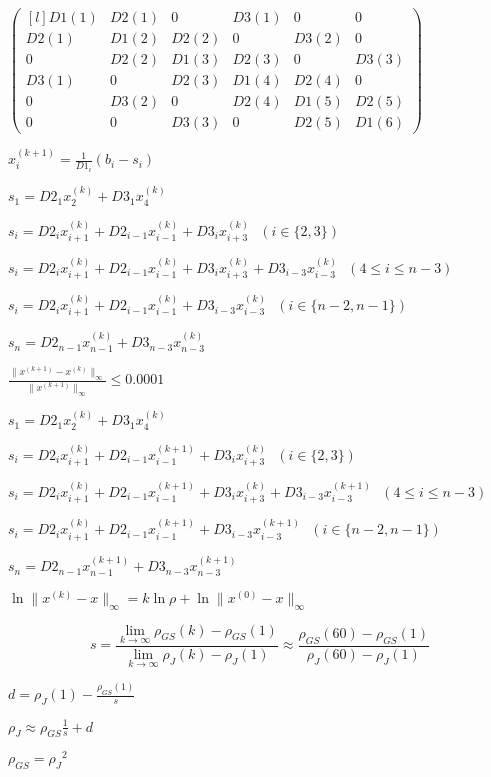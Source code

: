 \documentclass{article}
\begin{document}
	$
	\begin{pmatrix*}[l]
		D1(1) & D2(1) & 0 & D3(1) & 0 & 0 \\
		D2(1) & D1(2) & D2(2) & 0 & D3(2) & 0 \\
		0 & D2(2) & D1(3) & D2(3) & 0 & D3(3)\\
		D3(1) & 0 & D2(3) & D1(4) & D2(4) & 0 \\
		0 & D3(2) & 0 & D2(4) & D1(5) & D2(5) \\
		0 & 0 & D3(3) & 0 & D2(5) & D1(6)
	\end{pmatrix*}
	$
	
	$
	x_i^{(k+1)} = 
	\frac{1}{D1_i}(b_i-s_i)
	$
	
	$ 
	s_1 = D2_1x^{(k)}_2 + D3_1x_4^{(k)}
	$
	
	$
	s_i =  D2_ix^{(k)}_{i+1} + D2_{i-1}x^{(k)}_{i-1} + D3_ix^{(k)}_{i+3} \text{ } 
	 (i\in\{2,3\})
	$ 
	
	$ 
	s_i = D2_ix^{(k)}_{i+1} + D2_{i-1}x^{(k)}_{i-1} + D3_ix^{(k)}_{i+3} + D3_{i-3}x_{i-3}^{(k)} \text{ } 
		 (4 \leq i \leq n-3)
	$
	
	$ 
	s_i = D2_ix^{(k)}_{i+1} + D2_{i-1}x^{(k)}_{i-1} + D3_{i-3}x^{(k)}_{i-3} \text{ } 
	 (i \in\{n-2,n-1\})
	$
	
	$
	s_n = D2_{n-1}x^{(k)}_{n-1} + D3_{n-3}x^{(k)}_{n-3}
	$
	
	$
	\frac{\parallel x^{(k+1)} - x^{(k)} \parallel _\infty}{\parallel x^{(k+1)} \parallel _\infty} \leq 0.0001
	$	

	$ 
	s_1 = D2_1x^{(k)}_2 + D3_1x_4^{(k)}
	$
	
	$
	s_i =  D2_ix^{(k)}_{i+1} + D2_{i-1}x^{(k+1)}_{i-1} + D3_ix^{(k)}_{i+3} \text{ } 
 (i\in\{2,3\})
	$ 
	
	$ 
	s_i = D2_ix^{(k)}_{i+1} + D2_{i-1}x^{(k+1)}_{i-1} + D3_ix^{(k)}_{i+3} + D3_{i-3}x_{i-3}^{(k+1)} \text{ } 
	 (4 \leq i \leq n-3)
	$
	
	$ 
	s_i = D2_ix^{(k)}_{i+1} + D2_{i-1}x^{(k+1)}_{i-1} + D3_{i-3}x^{(k+1)}_{i-3} \text{ } 
	 (i \in\{n-2,n-1\})
	$
	
	$
	s_n = D2_{n-1}x^{(k+1)}_{n-1} + D3_{n-3}x^{(k+1)}_{n-3}
	$
	
	$
	\ln{\parallel x^{(k)} - x \parallel_\infty} = k\ln{\rho} + \ln{\parallel x^{(0)} - x \parallel_\infty}
	$
	
	\[
	s = \frac{ \lim_{k\to\infty}\rho_{GS}(k) - \rho_{GS}(1)}{ \lim_{k\to\infty}\rho_{J}(k) - \rho_{J}(1)} \approx \frac{ \rho_{GS}(60)- \rho_{GS}(1)}{ \rho_{J}(60) - \rho_{J}(1)}
	\]
	
	$
	d = \rho_J(1) - \frac{\rho_{GS}(1)}{s}
	$
	
	\vspace{0.5in}
	
	$
	\rho_{J}\approx\rho_{GS}\frac{1}{s} + d
	$
		\vspace{0.5in}
	
	$\rho_{GS} = {\rho_{J}}^2	
	$
\end{document}
